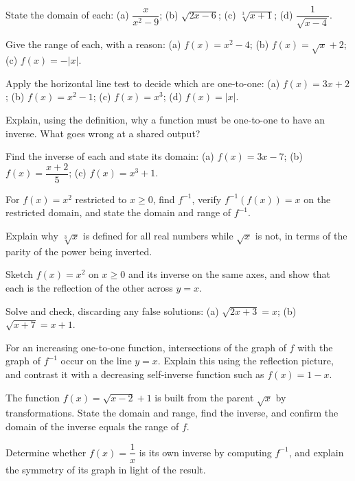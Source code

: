 \documentclass[12pt]{book}
\begin{document}
\begin{exercises}
\item State the domain of each: (a) $\dfrac{x}{x^2-9}$; (b) $\sqrt{2x-6}$;
(c) $\sqrt[3]{x+1}$; (d) $\dfrac{1}{\sqrt{x-4}}$.

\item Give the range of each, with a reason: (a) $f(x)=x^2-4$; (b) $f(x)=\sqrt{x}+2$;
(c) $f(x)=-|x|$.

\item Apply the horizontal line test to decide which are one-to-one:
(a) $f(x)=3x+2$; (b) $f(x)=x^2-1$; (c) $f(x)=x^3$; (d) $f(x)=|x|$.

\item Explain, using the definition, why a function must be one-to-one to have an
inverse. What goes wrong at a shared output?

\item Find the inverse of each and state its domain: (a) $f(x)=3x-7$;
(b) $f(x)=\dfrac{x+2}{5}$; (c) $f(x)=x^3+1$.

\item For $f(x)=x^2$ restricted to $x\ge0$, find $f^{-1}$, verify
$f^{-1}(f(x))=x$ on the restricted domain, and state the domain and range of $f^{-1}$.

\item Explain why $\sqrt[3]{x}$ is defined for all real numbers while $\sqrt{x}$ is
not, in terms of the parity of the power being inverted.

\item Sketch $f(x)=x^2$ on $x\ge0$ and its inverse on the same axes, and show that
each is the reflection of the other across $y=x$.

\item Solve and check, discarding any false solutions: (a) $\sqrt{2x+3}=x$;
(b) $\sqrt{x+7}=x+1$.

\item For an increasing one-to-one function, intersections of the graph of $f$ with
the graph of $f^{-1}$ occur on the line $y=x$. Explain this using the reflection
picture, and contrast it with a decreasing self-inverse function such as $f(x)=1-x$.

\item The function $f(x)=\sqrt{x-2}+1$ is built from the parent $\sqrt{x}$ by
transformations. State the domain and range, find the inverse, and confirm the domain
of the inverse equals the range of $f$.

\item Determine whether $f(x)=\dfrac{1}{x}$ is its own inverse by computing
$f^{-1}$, and explain the symmetry of its graph in light of the result.
\end{exercises}
\end{document}
